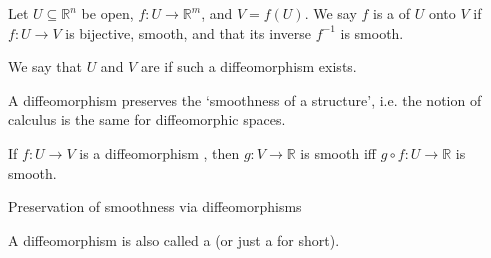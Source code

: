 \documentclass[notoc,notitlepage]{tufte-book}
\begin{document}
\begin{defn}[Diffeomorphism]\label{defn:diffeomorphism}
  Let $U \subseteq \mathbb{R}^n$ be open, $f : U \to \mathbb{R}^m$, and $V = f(U)$.
  We say $f$ is a  of $U$ onto $V$ if $f : U \to V$ is
  bijective, smooth, and that its inverse $f^{-1}$ is smooth.

  We say that $U$ and $V$ are  if such a diffeomorphism
  exists.
\end{defn}

\begin{note}
  A diffeomorphism preserves the `smoothness of a structure', i.e. the notion of
  calculus is the same for diffeomorphic spaces.
\end{note}

\begin{eg}
  If $f : U \to V$ is a diffeomorphism , then $g : V \to \mathbb{R}$ is smooth iff
  $g \circ f : U \to \mathbb{R}$ is smooth.
  \begin{marginfigure}
    \centering
    \caption{Preservation of smoothness via diffeomorphisms}\label{fig:preservation_of_smoothness_via_diffeomorphisms}
  \end{marginfigure}
\end{eg}

\begin{note}
  A diffeomorphism is also called a  (or just a
   for short).
\end{note}
\end{document}
